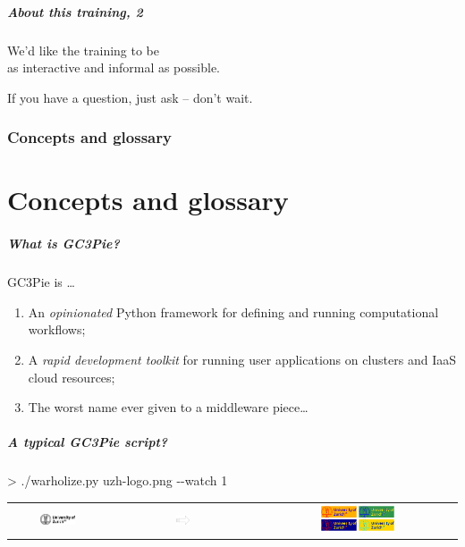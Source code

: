 \documentclass[english,serif,mathserif,usenames,dvipsnames]{beamer}
\begin{document}
\begin{frame}
  \frametitle{About this training, 2}
  \begin{center}
    We'd like the training to be \\ as interactive and informal as possible.

    \+ If you have a question, just ask -- don't wait.
  \end{center}
\end{frame}


\section{Concepts and glossary}
\part{Concepts and glossary}

\begin{frame}
  \frametitle{What is GC3Pie?}
  GC3Pie is \ldots
  \begin{enumerate}
  \item \alert<2>{An \emph{opinionated} Python framework for defining and running computational workflows;}
  \item \alert<1>{A \emph{rapid development toolkit} for running user applications on clusters and IaaS cloud resources;}
  \item The worst name ever given to a middleware piece\ldots
  \end{enumerate}

  \+
\end{frame}


\begin{frame}
  \frametitle{A typical GC3Pie script?}

\begin{semiverbatim}
    > ./warholize.py uzh-logo.png -{}-watch 1
\end{semiverbatim}

  \begin{tabular}[c]{ccc}
    \includegraphics[width=0.4\textwidth]{fig/uzh-logo.png}
    &
    \includegraphics[width=0.1\textwidth]{fig/arrow.pdf}
    &
    \includegraphics[width=0.4\textwidth]{fig/warholized-uzh-logo.png}
  \end{tabular}
\end{frame}
\end{document}
